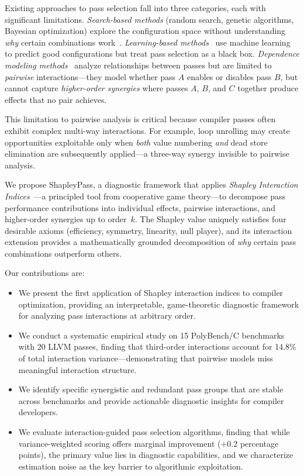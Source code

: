 \documentclass[preprint]{article}
\begin{document}
Existing approaches to pass selection fall into three categories, each with significant limitations. \emph{Search-based methods} (random search, genetic algorithms, Bayesian optimization) explore the configuration space without understanding \emph{why} certain combinations work~\citep{ashouri2017micomp}. \emph{Learning-based methods}~\citep{deng2025compilerdream, pan2025compilerr1} use machine learning to predict good configurations but treat pass selection as a black box. \emph{Dependence modeling methods}~\citep{gao2024odg, gao2025grouptuner} analyze relationships between passes but are limited to \emph{pairwise} interactions---they model whether pass $A$ enables or disables pass $B$, but cannot capture \emph{higher-order synergies} where passes $A$, $B$, and $C$ together produce effects that no pair achieves.

This limitation to pairwise analysis is critical because compiler passes often exhibit complex multi-way interactions. For example, loop unrolling may create opportunities exploitable only when \emph{both} value numbering \emph{and} dead store elimination are subsequently applied---a three-way synergy invisible to pairwise analysis.

We propose ShapleyPass, a diagnostic framework that applies \emph{Shapley Interaction Indices}~\citep{sundararajan2020shapley}---a principled tool from cooperative game theory---to decompose pass performance contributions into individual effects, pairwise interactions, and higher-order synergies up to order~$k$. The Shapley value uniquely satisfies four desirable axioms (efficiency, symmetry, linearity, null player), and its interaction extension provides a mathematically grounded decomposition of \emph{why} certain pass combinations outperform others.

Our contributions are:
\begin{itemize}
    \item We present the first application of Shapley interaction indices to compiler optimization, providing an interpretable, game-theoretic diagnostic framework for analyzing pass interactions at arbitrary order.
    \item We conduct a systematic empirical study on 15 PolyBench/C benchmarks with 20 LLVM passes, finding that third-order interactions account for 14.8\% of total interaction variance---demonstrating that pairwise models miss meaningful interaction structure.
    \item We identify specific synergistic and redundant pass groups that are stable across benchmarks and provide actionable diagnostic insights for compiler developers.
    \item We evaluate interaction-guided pass selection algorithms, finding that while variance-weighted scoring offers marginal improvement (+0.2 percentage points), the primary value lies in diagnostic capabilities, and we characterize estimation noise as the key barrier to algorithmic exploitation.
\end{itemize}
\end{document}
